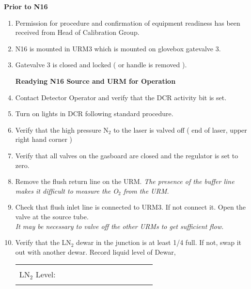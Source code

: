 \begin{center}
                    {\bf Prior to N16}
\end{center}
\begin{enumerate}
\item \checkbox Permission for procedure and confirmation of equipment readiness
  has been received from Head of Calibration Group.

\item \checkbox N16 is mounted in URM3 which is
  mounted on glovebox gatevalve 3.

\item \checkbox Gatevalve 3 is closed and locked ( or handle is removed ).

  

\begin{center}
                  {\bf Readying N16 Source and URM for Operation}
\end{center}
 

\item \checkbox Contact Detector Operator and verify that the DCR activity bit is set.
  

\item \checkbox Turn on lights in DCR following standard procedure.
  

\item \checkbox Verify that the high pressure N$_2$ to the laser is valved
off ( end of laser, upper right hand corner )


\item \checkbox Verify that all valves on the gasboard are closed and the regulator
is set to zero.



\item\checkbox Remove the flush return line on the URM.
  \small
  {\em The presence of the buffer line makes it difficult to measure the O$_2$ from
the URM.
  }
  \normalsize



\item\checkbox Check that flush inlet line is connected to URM3.  If not
  connect it. Open the valve at the source tube.\\
	\small
  {\em It may be necessary to valve off the other URMs to get sufficient flow.
  }
  \normalsize



\item \checkbox Verify that the LN$_2$ dewar in the junction is
  at least 1/4 full.  If not, swap it out with another dewar.
  Record liquid level of Dewar,
     \begin{center}
     \begin{tabular}{|l|}
     \hline
      \\
     LN$_2$ Level:~~~~~~~~~~~~~~~~~~~~~~~~\\
      \\
     \hline
     \end{tabular}
     \end{center}


\end{enumerate}
